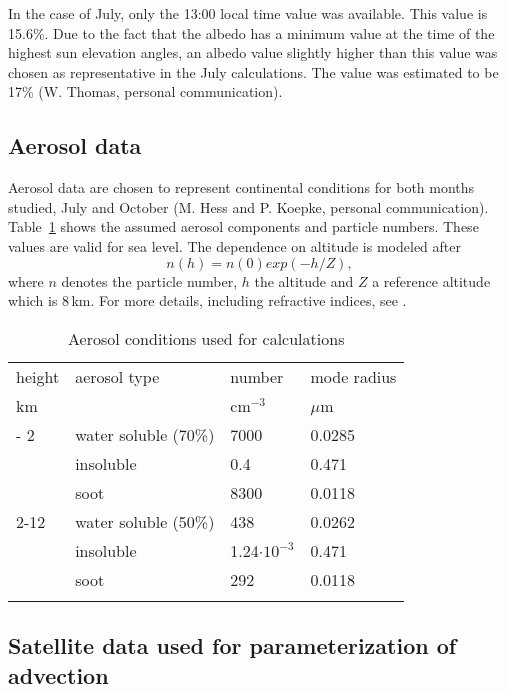 \documentclass[agp]{svjour}
\begin{document}
\begin{appendix}
In the case of July, only the 13:00 local time value was available. This
value is 15.6\%. Due to the fact that the albedo has a minimum value at
the time of the highest sun elevation angles, an albedo value slightly
higher than this value was chosen as representative in the July
calculations. The value was estimated to be 17\% (W. Thomas, personal
communication).

\subsection*{Aerosol data}

Aerosol data are chosen to represent continental conditions for both
months studied, July and October (M. Hess and P. Koepke, personal
communication). Table~\ref{tab:11} shows the assumed aerosol components
and particle numbers. These values are valid for sea level. The dependence
on altitude is modeled after
\begin{equation}
n(h) = n(0)exp(-h/Z),
\label{eq:2}
\end{equation}
where $n$ denotes the particle number, $h$ the altitude and $Z$ a reference
altitude which is 8\,km. For more details, including refractive indices,
see \citet{WM83}.

\begin{table}
\caption[]{Aerosol conditions used for calculations}
\begin{tabular*}{84.22mm}{@{\hspace{0pt}\extracolsep{\fill}}llll@{\hspace{0pt}}}
\noalign{\smallskip}
\hline
\noalign{\smallskip}
height & aerosol type & number & mode radius \\
km & & cm$^{-3}$ & $\mu$m \\
\noalign{\smallskip}\hline\noalign{\smallskip}
- 2 & water soluble (70\%)& 7000 & 0.0285 \\
& insoluble & 0.4 & 0.471 \\
& soot & 8300 & 0.0118 \\
2-12 & water soluble (50\%)& 438 & 0.0262 \\
& insoluble & 1.24$\cdot 10^{-3}$ & 0.471 \\
& soot & 292 & 0.0118 \\
\noalign{\smallskip}
\hline
\end{tabular*}
\label{tab:11}
\end{table}

\subsection*{Satellite data used for parameterization of advection}


\end{appendix}
\end{document}
